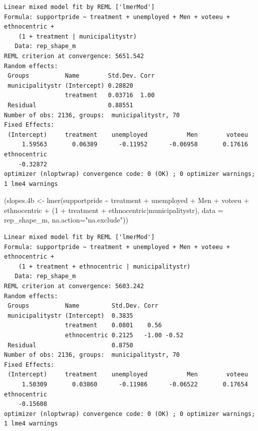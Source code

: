 \documentclass[
]{article}
\newenvironment{Shaded}{\begin{snugshade}}{\end{snugshade}}
\newcommand{\AttributeTok}[1]{\textcolor[rgb]{0.77,0.63,0.00}{#1}}
\newcommand{\DecValTok}[1]{\textcolor[rgb]{0.00,0.00,0.81}{#1}}
\newcommand{\FloatTok}[1]{\textcolor[rgb]{0.00,0.00,0.81}{#1}}
\newcommand{\FunctionTok}[1]{\textcolor[rgb]{0.00,0.00,0.00}{#1}}
\newcommand{\NormalTok}[1]{#1}
\newcommand{\OtherTok}[1]{\textcolor[rgb]{0.56,0.35,0.01}{#1}}
\newcommand{\SpecialCharTok}[1]{\textcolor[rgb]{0.00,0.00,0.00}{#1}}
\newcommand{\StringTok}[1]{\textcolor[rgb]{0.31,0.60,0.02}{#1}}
\begin{document}
\begin{verbatim}
Linear mixed model fit by REML ['lmerMod']
Formula: supportpride ~ treatment + unemployed + Men + voteeu + ethnocentric +  
    (1 + treatment | municipalitystr)
   Data: rep_shape_m
REML criterion at convergence: 5651.542
Random effects:
 Groups          Name        Std.Dev. Corr
 municipalitystr (Intercept) 0.28820      
                 treatment   0.03716  1.00
 Residual                    0.88551      
Number of obs: 2136, groups:  municipalitystr, 70
Fixed Effects:
 (Intercept)     treatment    unemployed           Men        voteeu  
     1.59563       0.06389      -0.11952      -0.06958       0.17616  
ethnocentric  
    -0.32872  
optimizer (nloptwrap) convergence code: 0 (OK) ; 0 optimizer warnings; 1 lme4 warnings 
\end{verbatim}

\begin{Shaded}
\begin{Highlighting}[]
\NormalTok{(slopes}\FloatTok{.4}\NormalTok{b }\OtherTok{\textless{}{-}} \FunctionTok{lmer}\NormalTok{(supportpride }\SpecialCharTok{\textasciitilde{}}\NormalTok{ treatment }\SpecialCharTok{+}\NormalTok{ unemployed }\SpecialCharTok{+}\NormalTok{ Men }\SpecialCharTok{+}\NormalTok{ voteeu }\SpecialCharTok{+}\NormalTok{ ethnocentric }\SpecialCharTok{+}\NormalTok{ (}\DecValTok{1} \SpecialCharTok{+}\NormalTok{ treatment }\SpecialCharTok{+}\NormalTok{ ethnocentric}\SpecialCharTok{|}\NormalTok{municipalitystr),}
                   \AttributeTok{data =}\NormalTok{ rep\_shape\_m, }\AttributeTok{na.action=}\StringTok{"na.exclude"}\NormalTok{))}
\end{Highlighting}
\end{Shaded}

\begin{verbatim}
Linear mixed model fit by REML ['lmerMod']
Formula: supportpride ~ treatment + unemployed + Men + voteeu + ethnocentric +  
    (1 + treatment + ethnocentric | municipalitystr)
   Data: rep_shape_m
REML criterion at convergence: 5603.242
Random effects:
 Groups          Name         Std.Dev. Corr       
 municipalitystr (Intercept)  0.3835              
                 treatment    0.0801    0.56      
                 ethnocentric 0.2125   -1.00 -0.52
 Residual                     0.8750              
Number of obs: 2136, groups:  municipalitystr, 70
Fixed Effects:
 (Intercept)     treatment    unemployed           Men        voteeu  
     1.50309       0.03860      -0.11986      -0.06522       0.17654  
ethnocentric  
    -0.15608  
optimizer (nloptwrap) convergence code: 0 (OK) ; 0 optimizer warnings; 1 lme4 warnings 
\end{verbatim}
\end{document}
